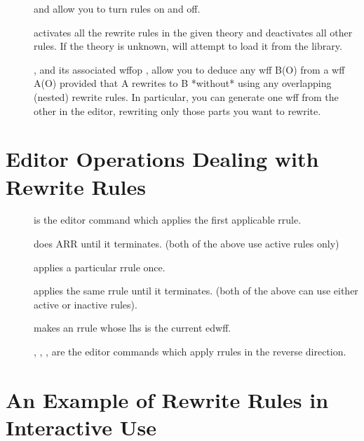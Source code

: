 \begin{description}
\item[]  and  allow you to turn rules on and off.

\item[]  activates all the rewrite rules in the given theory and deactivates
  all other rules. If the theory is unknown, {\TPS} will attempt to load it from the library.

\item[] , and its associated wffop , allow you to deduce
 any wff B(O) from a wff A(O) provided that A rewrites to B *without* using any
 overlapping (nested) rewrite rules. In particular, you can generate one wff from
 the other in the editor, rewriting only those parts you want to rewrite.
\end{description}


\section{Editor Operations Dealing with Rewrite Rules}
\begin{description}
\item[]  is the editor command which applies the first applicable rrule.

\item[]  does ARR until it terminates.
  (both of the above use active rules only)

\item[]  applies a particular rrule once.

\item[]  applies the same rrule until it terminates.
  (both of the above can use either active or inactive rules).

\item[]  makes an rrule whose lhs is the current edwff.

\item[] , , ,  are the
  editor commands which apply rrules in the reverse direction.
\end{description}
%

\section{An Example of Rewrite Rules in Interactive Use}

